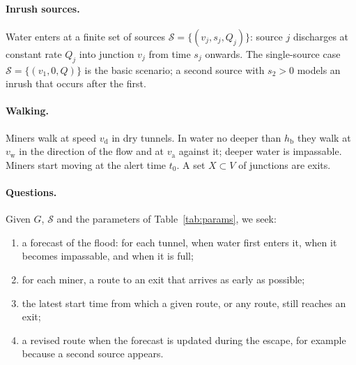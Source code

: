 \documentclass[11pt,a4paper]{article}
\theoremstyle{plain}
\theoremstyle{definition}
\theoremstyle{remark}
\newcommand{\hb}{h_{\mathrm{b}}}
\newcommand{\vd}{v_{\mathrm{d}}}
\newcommand{\vw}{v_{\mathrm{w}}}
\newcommand{\va}{v_{\mathrm{a}}}
\begin{document}
\paragraph{Inrush sources.} Water enters at a finite set of sources $\mathcal{S} = \{(v_j, s_j, Q_j)\}$: source $j$ discharges at constant rate $Q_j$ into junction $v_j$ from time $s_j$ onwards. The single-source case $\mathcal{S} = \{(v_1, 0, Q)\}$ is the basic scenario; a second source with $s_2 > 0$ models an inrush that occurs after the first.

\paragraph{Walking.} Miners walk at speed $\vd$ in dry tunnels. In water no deeper than $\hb$ they walk at $\vw$ in the direction of the flow and at $\va$ against it; deeper water is impassable. Miners start moving at the alert time $t_0$. A set $X \subset V$ of junctions are exits.

\paragraph{Questions.} Given $G$, $\mathcal{S}$ and the parameters of Table~\ref{tab:params}, we seek:
\begin{enumerate}[leftmargin=2em, itemsep=1pt, topsep=2pt, label=(\roman*)]
  \item a forecast of the flood: for each tunnel, when water first enters it, when it becomes impassable, and when it is full;
  \item for each miner, a route to an exit that arrives as early as possible;
  \item the latest start time from which a given route, or any route, still reaches an exit;
  \item a revised route when the forecast is updated during the escape, for example because a second source appears.
\end{enumerate}
\end{document}
